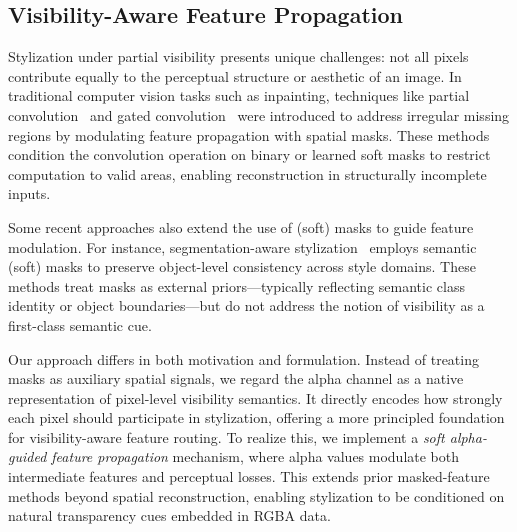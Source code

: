 \documentclass[letterpaper]{article} %
\begin{document}


\subsection{Visibility-Aware Feature Propagation}

Stylization under partial visibility presents unique challenges: not all pixels contribute equally to the perceptual structure or aesthetic of an image. In traditional computer vision tasks such as inpainting, techniques like partial convolution~\cite{liu2018image} and gated convolution~\cite{yu2019free} were introduced to address irregular missing regions by modulating feature propagation with spatial masks. These methods condition the convolution operation on binary or learned soft masks to restrict computation to valid areas, enabling reconstruction in structurally incomplete inputs.

Some recent approaches also extend the use of (soft) masks to guide feature modulation. For instance, segmentation-aware stylization~\cite{zhao2020automatic,yu2024foreground, ko2023continuously} employs semantic (soft) masks to preserve object-level consistency across style domains. These methods treat masks as external priors—typically reflecting semantic class identity or object boundaries—but do not address the notion of visibility as a first-class semantic cue.

Our approach differs in both motivation and formulation. Instead of treating masks as auxiliary spatial signals, we regard the alpha channel as a native representation of pixel-level visibility semantics. It directly encodes how strongly each pixel should participate in stylization, offering a more principled foundation for visibility-aware feature routing. To realize this, we implement a \textit{soft alpha-guided feature propagation} mechanism, where alpha values modulate both intermediate features and perceptual losses. This extends prior masked-feature methods beyond spatial reconstruction, enabling stylization to be conditioned on natural transparency cues embedded in RGBA data.
\end{document}

